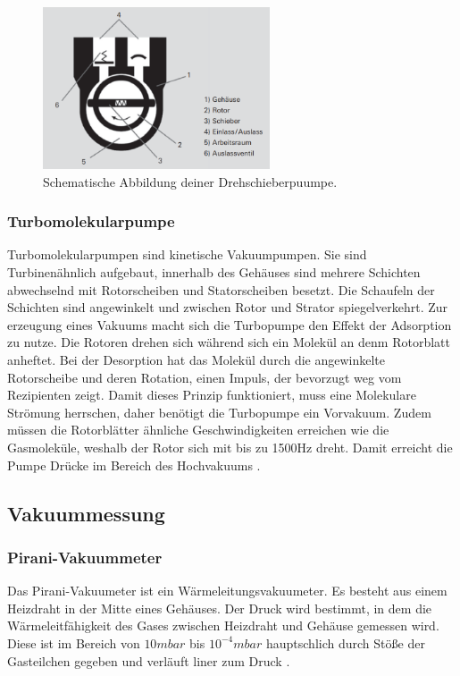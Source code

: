     \begin{figure}
        \centering
        \caption{Schematische Abbildung deiner Drehschieberpuumpe.}
        \label{fig:Drehschieberpumpe}
        \includegraphics[width=0.6\textwidth]{Drehschieberpumpe.png}
    \end{figure}

\subsubsection{Turbomolekularpumpe}
Turbomolekularpumpen sind kinetische Vakuumpumpen.
Sie sind Turbinenähnlich aufgebaut, innerhalb des Gehäuses sind mehrere Schichten abwechselnd mit Rotorscheiben und Statorscheiben besetzt.
Die Schaufeln der Schichten sind angewinkelt und zwischen Rotor und Strator spiegelverkehrt. 
Zur erzeugung eines Vakuums macht sich die Turbopumpe den Effekt der Adsorption zu nutze. Die Rotoren drehen sich während sich ein Molekül an denm Rotorblatt 
anheftet. Bei der Desorption hat das Molekül durch die angewinkelte Rotorscheibe und deren Rotation, einen Impuls, der bevorzugt weg vom Rezipienten zeigt.
Damit dieses Prinzip funktioniert, muss eine Molekulare Strömung herrschen, daher benötigt die Turbopumpe ein Vorvakuum. Zudem müssen die Rotorblätter ähnliche Geschwindigkeiten 
erreichen wie die Gasmoleküle, weshalb der Rotor sich mit bis zu 1500Hz dreht.
Damit erreicht die Pumpe Drücke im Bereich des Hochvakuums \cite{Pfeiffer, S.83,84}.


\subsection{Vakuummessung}
\subsubsection{Pirani-Vakuummeter}
Das Pirani-Vakuumeter ist ein Wärmeleitungsvakuumeter. Es besteht aus einem Heizdraht in der Mitte eines Gehäuses.
Der Druck wird bestimmt, in dem die Wärmeleitfähigkeit des Gases zwischen Heizdraht und Gehäuse gemessen wird. 
Diese ist im Bereich von $10 mbar$ bis $10^{-4} mbar$ hauptschlich durch Stöße der Gasteilchen gegeben und verläuft liner zum Druck \cite{Pfeiffer, S.93,94}.


